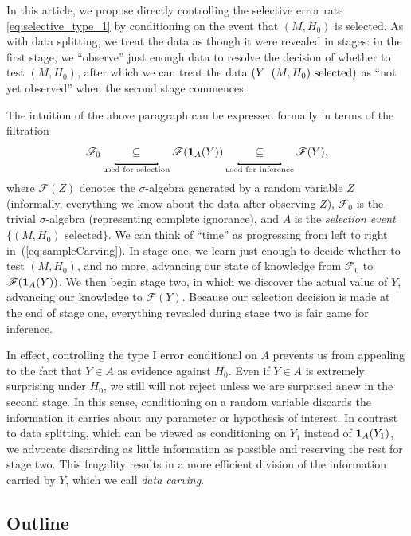 \documentclass{article}
\theoremstyle{definition}
\newcommand{\sF}{\mathscr{F}}
\newcommand*\mystrut{\vrule width0pt height0pt depth1.5ex\relax}
\newcommand{\underlabel}{\underbracket[1pt][.5pt]{\mystrut \quad\;\; \sub \quad\;\; }}
\newcommand{\sampOrData}{data }
\begin{document}
In this article, we propose directly controlling the selective error rate \eqref{eq:selective_type_1} by conditioning on the event that $(M,H_0)$ is selected. As with \sampOrData splitting, we treat the data as though it were revealed in stages: in the first stage, we ``observe'' just enough data to resolve the decision of whether to test $(M,H_0)$, after which we can treat the data $(Y \,|\, (M, H_0)\text{ selected})$ as ``not yet observed'' when the second stage commences.

The intuition of the above paragraph can be expressed formally in terms of the filtration
\begin{equation}\label{eq:sampleCarving}
  \sF_0 \underlabel_{\text{used for selection}} \sF(\1_A(Y))
  \underlabel_{\text{used for inference}} \sF(Y),
\end{equation}
where $\sF(Z)$ denotes the $\sigma$-algebra generated by a random variable $Z$ (informally, everything we know about the data after observing $Z$), $\sF_0$ is the trivial $\sigma$-algebra (representing complete ignorance), and $A$ is the {\em selection event} $\{(M, H_0)\text{ selected}\}$. We can think of ``time'' as progressing from left to right in~(\ref{eq:sampleCarving}). In stage one, we learn just enough to decide whether to test $(M,H_0)$, and no more, advancing our state of knowledge from $\sF_0$ to $\sF(\1_A(Y))$. We then begin stage two, in which we discover the actual value of $Y$, advancing our knowledge to $\sF(Y)$. Because our selection decision is made at the end of stage one, everything revealed during stage two is fair game for inference.


In effect, controlling the type I error conditional on $A$ prevents us from appealing to the fact that $Y\in A$ as evidence against $H_0$. Even if $Y\in A$ is extremely surprising under $H_0$, we still will not reject unless we are surprised anew in the second stage.
In this sense, conditioning on a random variable discards the information it carries about any parameter or hypothesis of interest. In contrast to data splitting, which can be viewed as conditioning on $Y_{1}$ instead of $\mathbf{1}_A(Y_{1})$, we advocate discarding as little information as possible and reserving the rest for stage two. This frugality results in a more efficient division of the information carried by $Y$, which we call {\em \sampOrData carving}.

\subsection{Outline}
\end{document}
